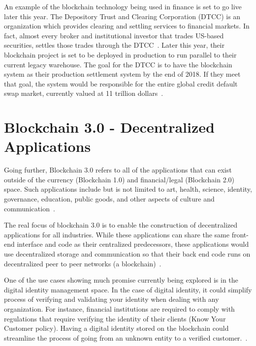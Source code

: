 An example of the blockchain technology being used in finance is set to go live later this year. The Depository Trust and Clearing Corporation (DTCC) is an organization which provides clearing and settling services to financial markets. In fact, almost every broker and institutional investor that trades US-based securities, settles those trades through the DTCC~\cite{hid-sp18-414-wallstreet-blockchain}. Later this year, their blockchain project is set to be deployed in production to run parallel to their current legacy warehouse. The goal for the DTCC is to have the blockchain system as their production settlement system by the end of 2018. If they meet that goal, the system would be responsible for the entire global credit default swap market, currently valued at 11 trillion dollars~\cite{hid-sp18-414-www-blockchain-2.0}.

\section{Blockchain 3.0 - Decentralized Applications}
Going further, Blockchain 3.0 refers to all of the applications that can exist outside of the currency (Blockchain 1.0) and financial/legal (Blockchain 2.0) space. Such applications include but is not limited to art, health, science, identity, governance, education, public goods, and other aspects of culture and communication~\cite{hid-sp18-414-www-blockchain-theory-application}.

The real focus of blockchain 3.0 is to enable the construction of decentralized applications for all industries. While these applications can share the same front-end interface and code as their centralized predecessors, these applications would use decentralized storage and communication so that their back end code runs on decentralized peer to peer networks (a blockchain)~\cite{hid-sp18-414-www-blockchain-evolution}.

One of the use cases showing much promise currently being explored is in the digital identity management space. In the case of digital identity, it could simplify process of verifying and validating your identity when dealing with any organization. For instance, financial institutions are required to comply with regulations that require verifying the identity of their clients (Know Your Customer policy). Having a digital identity stored on the blockchain could streamline the process of going from an unknown entity to a verified customer.~\cite{hid-sp18-414-beyond-bitcoin}. 

